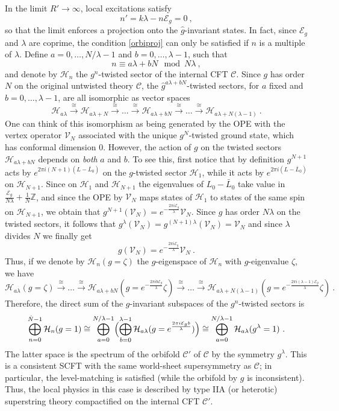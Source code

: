 \documentclass[a4paper,11pt]{article}
\newcommand{\ZZ}{\mathbb{Z}}
\newcommand{\C}{\mathcal{C}}
\newcommand{\E}{\mathcal{E}}
\newcommand{\Hh}{\mathcal{H}}
\newcommand{\V}{\mathcal{V}}
\numberwithin{equation}{section}
\def\be{\begin{equation}}
\def\ee{\end{equation}}
\begin{document}
  In the limit $R'\to\infty$, local excitations satisfy
\be\label{orbiproj} n'=k\lambda-n\E_g=0\ ,
\ee so that the limit enforces a projection onto the $\hat g$-invariant states. In fact, since $\E_g$ and $\lambda$ are coprime, the condition \eqref{orbiproj} can only be satisfied if $n$ is a multiple of $\lambda$. Define $a=0,\ldots,N/\lambda-1$ and $b=0,\ldots, \lambda-1$, such that 
\be n\equiv a\lambda+bN\mod N\lambda\ ,\ee 
and denote by $\Hh_n$ the $g^n$-twisted sector of the internal CFT $\C$.   Since $g$ has order $N$ on the original untwisted theory $\C$, the $\hat g^{a\lambda+bN}$-twisted sectors, for $a$ fixed and $b=0,\ldots, \lambda-1$, are all isomorphic as vector spaces
\be\label{twistisom} \Hh_{a\lambda}\stackrel{\cong}{\longrightarrow} \Hh_{a\lambda+N}\stackrel{\cong}{\longrightarrow} \ldots\stackrel{\cong}{\longrightarrow} \Hh_{a\lambda+bN}\stackrel{\cong}{\longrightarrow} \ldots\stackrel{\cong}{\longrightarrow}\Hh_{a\lambda+N(\lambda-1)}\ .
\ee One can think of this isomorphism as being generated by the OPE with the vertex operator $\V_N$ associated with the unique $g^N$-twisted ground state, which has conformal dimension $0$. 
However, the action of $g$ on the twisted sectors $\Hh_{a\lambda+bN}$ depends on \emph{both} $a$ and $b$. To see this, first notice that by definition $g^{N+1}$ acts by $e^{2\pi i(N+1)(L-\bar L_0)}$ on the $g$-twisted sector $\Hh_1$, while it acts by $e^{2\pi i(L-\bar L_0)}$ on $\Hh_{N+1}$. Since on $\Hh_1$ and $\Hh_{N+1}$ the eigenvalues of $L_0-\bar L_0$ take value in $\frac{\E_g}{N\lambda}+\frac{1}{N}\ZZ$, and since the OPE by $\V_N$ maps states of $\Hh_1$ to states of the same spin on $\Hh_{N+1}$, we obtain that $g^{N+1}(\V_N)=e^{-\frac{2\pi i\E_g}{\lambda}}\V_N$. Since $g$ has order $N\lambda$ on the twisted sectors, it follows that $g^\lambda(\V_N)=g^{(N+1)\lambda}(\V_N)=\V_N$ and since $\lambda$ divides $N$ we finally get
\be g(\V_N)=e^{-\frac{2\pi i\E_g}{\lambda}}\V_N\ .
\ee
  Thus, if we denote by $\Hh_n(g=\zeta)$ the $g$-eigenspace of $\Hh_n$ with $g$-eigenvalue $\zeta$, we have
\be \Hh_{a\lambda}(g=\zeta)\stackrel{\cong}{\longrightarrow} \ldots\stackrel{\cong}{\longrightarrow} \Hh_{a\lambda+bN}(g=e^{-\frac{2\pi i b\E_g}{\lambda}}\zeta)\stackrel{\cong}{\longrightarrow} \ldots\stackrel{\cong}{\longrightarrow}\Hh_{a\lambda+N(\lambda-1)}(g=e^{-\frac{2\pi i (\lambda-1)\E_g}{\lambda}}\zeta)\ .
\ee Therefore, the direct sum of the $g$-invariant subspaces of the $g^n$-twisted sectors is
\be \bigoplus_{n=0}^{\hat N-1} \Hh_n(g=1)\cong \bigoplus_{a=0}^{N/\lambda-1}\Bigl(\bigoplus_{b=0}^{\lambda-1} \Hh_{a\lambda}(g=e^{\frac{2\pi i \E_g b}{\lambda}})\Bigr)\cong \bigoplus_{a=0}^{N/\lambda-1} \Hh_{a\lambda}(g^\lambda=1)\ .
\ee The latter space is the spectrum of the orbifold $\C'$ of $\C$ by the symmetry $g^\lambda$. This is a consistent SCFT with the same world-sheet supersymmetry as $\C$; in particular, the level-matching is satisfied (while the orbifold by $g$ is inconsistent).  Thus, the local physics in this case is described by type IIA (or heterotic) superstring theory compactified on the internal CFT $\C'$. 
\end{document}
